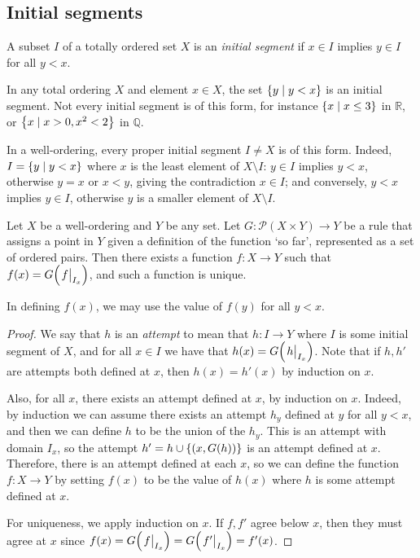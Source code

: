 \subsection{Initial segments}
\begin{definition}
    A subset \( I \) of a totally ordered set \( X \) is an \emph{initial segment} if \( x \in I \) implies \( y \in I \) for all \( y < x \).
\end{definition}
\begin{example}
    In any total ordering \( X \) and element \( x \in X \), the set \( \qty{y \mid y < x} \) is an initial segment.
    Not every initial segment is of this form, for instance \( \qty{x \mid x \leq 3} \) in \( \mathbb R \), or \( \qty{x \mid x > 0, x^2 < 2} \) in \( \mathbb Q \).

    In a well-ordering, every proper initial segment \( I \neq X \) is of this form.
    Indeed, \( I = \qty{y \mid y < x} \) where \( x \) is the least element of \( X \setminus I \): \( y \in I \) implies \( y < x \), otherwise \( y = x \) or \( x < y \), giving the contradiction \( x \in I \); and conversely, \( y < x \) implies \( y \in I \), otherwise \( y \) is a smaller element of \( X \setminus I \).
\end{example}
\begin{theorem}
    Let \( X \) be a well-ordering and \( Y \) be any set.
    Let \( G \colon \mathcal P(X \times Y) \to Y \) be a rule that assigns a point in \( Y \) given a definition of the function `so far', represented as a set of ordered pairs.
    Then there exists a function \( f \colon X \to Y \) such that \( f(x) = G\qty(\eval{f}_{I_x}) \), and such a function is unique.
\end{theorem}
\begin{remark}
    In defining \( f(x) \), we may use the value of \( f(y) \) for all \( y < x \).
\end{remark}
\begin{proof}
    We say that \( h \) is an \emph{attempt} to mean that \( h \colon I \to Y \) where \( I \) is some initial segment of \( X \), and for all \( x \in I \) we have that \( h(x) = G\qty(\eval{h}_{I_x}) \).
    Note that if \( h, h' \) are attempts both defined at \( x \), then \( h(x) = h'(x) \) by induction on \( x \).

    Also, for all \( x \), there exists an attempt defined at \( x \), by induction on \( x \).
    Indeed, by induction we can assume there exists an attempt \( h_y \) defined at \( y \) for all \( y < x \), and then we can define \( h \) to be the union of the \( h_y \).
    This is an attempt with domain \( I_x \), so the attempt \( h' = h \cup \qty{(x, G(h))} \) is an attempt defined at \( x \).
    Therefore, there is an attempt defined at each \( x \), so we can define the function \( f \colon X \to Y \) by setting \( f(x) \) to be the value of \( h(x) \) where \( h \) is some attempt defined at \( x \).

    For uniqueness, we apply induction on \( x \).
    If \( f, f' \) agree below \( x \), then they must agree at \( x \) since \( f(x) = G\qty(\eval{f}_{I_x}) = G\qty(\eval{f'}_{I_x}) = f'(x) \).
\end{proof}
